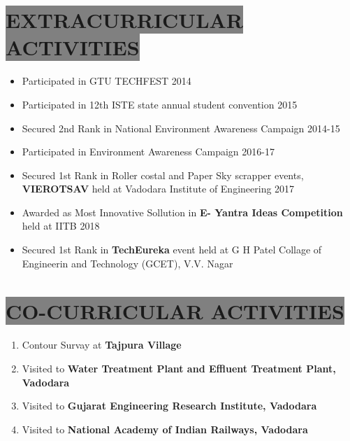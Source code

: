\documentclass{res} %
\begin{document}
\begin{resume}
\section{
\colorbox{grey}{EXTRACURRICULAR ACTIVITIES}          
}
\begin{itemize} 
 \item Participated in GTU TECHFEST 2014
 \item Participated in 12th ISTE state annual student convention 2015
 \item Secured 2nd Rank in National Environment Awareness Campaign 2014-15
 \item Participated in Environment Awareness Campaign 2016-17
 \item Secured 1st Rank in Roller costal and Paper Sky scrapper events, \textbf{VIEROTSAV} held at Vadodara Institute of Engineering 2017
 \item Awarded as Most Innovative Sollution in \textbf{E- Yantra Ideas Competition} held at IITB 2018
 \item Secured 1st Rank in \textbf{TechEureka} event held at G H Patel Collage of Engineerin and Technology (GCET), V.V. Nagar
 \end{itemize}


\section{
\colorbox{grey}{CO-CURRICULAR ACTIVITIES} 
}         
\begin{enumerate} 
 \item Contour Survay at \textbf{Tajpura Village}
 \item Visited to \textbf{ Water Treatment Plant and Effluent Treatment Plant, Vadodara}
\item Visited to \textbf{ Gujarat Engineering Research Institute, Vadodara}
\item Visited to \textbf{ National Academy of Indian Railways, Vadodara }
 \end{enumerate}







\end{resume}
\end{document}
